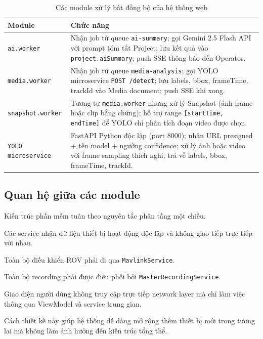 \documentclass[../DoAn.tex]{subfiles}
\begin{document}
\begin{table}[H]
\centering
\renewcommand{\arraystretch}{1.3}
\begin{tabular}{|p{4.5cm}|p{9cm}|}
\hline
\textbf{Module} & \textbf{Chức năng} \\
\hline
\texttt{ai.worker} & Nhận job từ queue \texttt{ai-summary}; gọi Gemini 2.5 Flash API với prompt tóm tắt Project; lưu kết quả vào \texttt{project.aiSummary}; push SSE thông báo đến Operator. \\
\hline
\texttt{media.worker} & Nhận job từ queue \texttt{media-analysis}; gọi YOLO microservice \texttt{POST /detect}; lưu labels, bbox, frameTime, trackId vào Media document; push SSE khi xong. \\
\hline
\texttt{snapshot.worker} & Tương tự \texttt{media.worker} nhưng xử lý Snapshot (ảnh frame hoặc clip bằng chứng); hỗ trợ range \texttt{[startTime, endTime]} để YOLO chỉ phân tích đoạn video được chọn. \\
\hline
\texttt{YOLO microservice} & FastAPI Python độc lập (port 8000); nhận URL presigned + tên model + ngưỡng confidence; xử lý ảnh hoặc video với frame sampling thích nghi; trả về labels, bbox, frameTime, trackId. \\
\hline
\end{tabular}
\caption{Các module xử lý bất đồng bộ của hệ thống web}
\label{tab:web_async_modules}
\end{table}

\subsection{Quan hệ giữa các module}

Kiến trúc phần mềm tuân theo nguyên tắc phân tầng một chiều.

Các service nhận dữ liệu thiết bị hoạt động độc lập và không giao tiếp
trực tiếp với nhau.

Toàn bộ điều khiển ROV phải đi qua \texttt{MavlinkService}.

Toàn bộ recording phải được điều phối bởi
\texttt{MasterRecordingService}.

Giao diện người dùng không truy cập trực tiếp network layer mà chỉ làm
việc thông qua ViewModel và service trung gian.

Cách thiết kế này giúp hệ thống dễ dàng mở rộng thêm thiết bị mới trong
tương lai mà không làm ảnh hưởng đến kiến trúc tổng thể.
\end{document}
